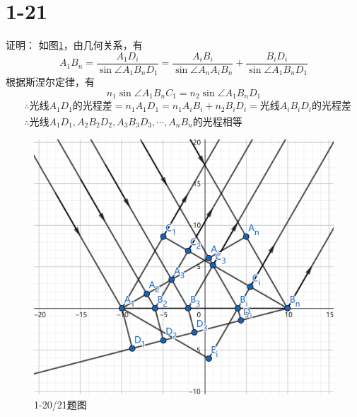 \documentclass[10pt,a4paper]{article}
\theoremstyle{remark}
\begin{document}
\section*{1-21}证明：
如图\ref{FigureofProblem1-20/21}，由几何关系，有
\[
A_1B_n = \frac{A_1D_i}{\sin\angle A_1B_nD_1} = \frac{A_iB_i}{\sin\angle A_nA_iB_n} + \frac{B_iD_i}{\sin\angle A_1B_nD_1}
\]
根据斯涅尔定律，有
\[
n_1 \sin\angle A_1B_nC_1 = n_2 \sin\angle A_1B_nD_1
\]
\begin{align*}
&\therefore\text{光线}A_1D_1\text{的光程差} = n_1A_1D_1 = n_1A_iB_i + n_2B_iD_i = \text{光线}A_iB_iD_i\text{的光程差}\\
&\therefore\text{光线}A_1D_1,A_2B_2D_2,A_3B_3D_3,\cdots,A_nB_n\text{的光程相等}
\end{align*}
\begin{figure}%
\centering
\includegraphics[scale = .3]{FigureofProblem1-20_21(tailored).png}
\caption{1-20/21题图}\label{FigureofProblem1-20/21}
\end{figure}
\end{document}
